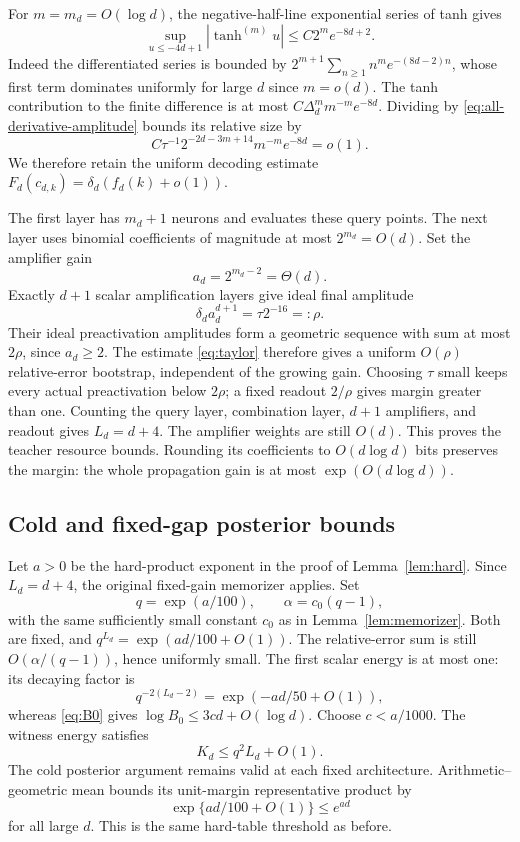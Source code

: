For $m=m_d=O(\log d)$, the negative-half-line exponential series of
tanh gives
\[
 \sup_{u\le-4d+1}|\tanh^{(m)}u|
 \le C2^m e^{-8d+2}.
\]
Indeed the differentiated series is bounded by
$2^{m+1}\sum_{n\ge1}n^me^{-(8d-2)n}$, whose first term dominates
uniformly for large $d$ since $m=o(d)$. The tanh contribution to
the finite difference is at most
$C\Delta_d^m m^{-m}e^{-8d}$. Dividing by
\eqref{eq:all-derivative-amplitude} bounds its relative size by
\[
 C\tau^{-1}2^{-2d-3m+14}m^{-m}e^{-8d}=o(1).
\]
We therefore retain the uniform decoding estimate
$F_d(c_{d,k})=\delta_d(f_d(k)+o(1))$.

The first layer has $m_d+1$ neurons and evaluates these query
points. The next layer uses binomial coefficients of magnitude at
most $2^{m_d}=O(d)$. Set the amplifier gain
\[
 a_d=2^{m_d-2}=\Theta(d).
\]
Exactly $d+1$ scalar amplification layers give ideal final amplitude
\[
 \delta_da_d^{d+1}=\tau2^{-16}=: \rho.
\]
Their ideal preactivation amplitudes form a geometric sequence with
sum at most $2\rho$, since $a_d\ge2$. The estimate
\eqref{eq:taylor} therefore gives a uniform $O(\rho)$ relative-error
bootstrap, independent of the growing gain. Choosing $\tau$ small
keeps every actual preactivation below $2\rho$; a fixed readout
$2/\rho$ gives margin greater than one. Counting the query layer,
combination layer, $d+1$ amplifiers, and readout gives $L_d=d+4$.
The amplifier weights are still $O(d)$. This proves the teacher
resource bounds. Rounding its coefficients to $O(d\log d)$ bits
preserves the margin: the whole propagation gain is at most
$\exp(O(d\log d))$.

\subsection{Cold and fixed-gap posterior bounds}

Let $a>0$ be the hard-product exponent in the proof of
Lemma~\ref{lem:hard}. Since $L_d=d+4$, the original fixed-gain
memorizer applies. Set
\[
 q=\exp(a/100),\qquad \alpha=c_0(q-1),
\]
with the same sufficiently small constant $c_0$ as in
Lemma~\ref{lem:memorizer}. Both are fixed, and
$q^{L_d}=\exp(ad/100+O(1))$.
The relative-error sum is still $O(\alpha/(q-1))$, hence
uniformly small. The first scalar energy is at most one: its
decaying factor is
\[
 q^{-2(L_d-2)}=\exp(-ad/50+O(1)),
\]
whereas \eqref{eq:B0} gives $\log B_0\le3cd+O(\log d)$.
Choose $c<a/1000$. The witness energy satisfies
\begin{equation}\label{eq:all-derivative-memorizer}
 K_d\le q^2L_d+O(1).
\end{equation}
The cold posterior argument remains valid at each fixed
architecture. Arithmetic--geometric mean bounds its unit-margin
representative product by
\[
 \exp\{ad/100+O(1)\}\le e^{ad}
\]
for all large $d$. This is the same hard-table threshold as before.

